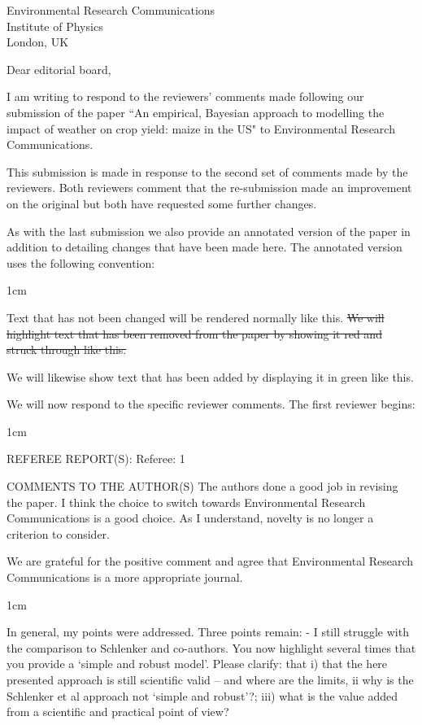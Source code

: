 \documentclass{letter}
\newcommand{\remove}[1]{   
    \color{red}
    \sout{#1}
    }
\newcommand{\add}[1]{   
    \color{green}
    #1
    }
\newcommand{\paper}[1]{   
    \begin{adjustwidth}{1cm}{}
    #1
    \end{adjustwidth}
    }
\newcommand{\review}[1]{   
    \begin{adjustwidth}{1cm}{}
    \em{#1}
    \end{adjustwidth}
    }
\begin{document}
\begin{letter}{Environmental Research Communications \\ Institute of Physics \\ London, UK}

\opening{Dear editorial board,}

I am writing to respond to the reviewers' comments made following our submission of the paper ``An empirical, Bayesian approach to modelling the impact of weather on crop yield: maize in the US" to Environmental Research Communications. 

This submission is made in response to the second set of comments made by the reviewers. Both reviewers comment that the re-submission made an improvement on the original but both have requested some further changes.




As with the last submission we also provide an annotated version of the paper in addition to detailing changes that have been made here. The annotated version uses the following convention:
\paper{
Text that has not been changed will be rendered normally like this. \remove{We will highlight text that has been removed from the paper by showing it red and struck through like this.}\add{We will likewise show text that has been added by displaying it in green like this.}
}



We will now respond to the specific reviewer comments. The first reviewer begins:


\review{
REFEREE REPORT(S):
Referee: 1

COMMENTS TO THE AUTHOR(S)
The authors done a good job in revising the paper. I think the choice to switch towards Environmental Research Communications is a good choice. As I understand, novelty is no longer a criterion to consider.
}

We are grateful for the positive comment and agree that Environmental Research Communications is a more appropriate journal.

\review{

In general, my points were addressed. Three points remain:
- I still struggle with the comparison to Schlenker and co-authors. You now highlight several times that you provide a ‘simple and robust model’. Please clarify: that i) that the here presented approach is still scientific valid – and where are the limits, ii why is the Schlenker et al approach not ‘simple and robust’?; iii) what is the value added from a scientific and practical point of view?

}
\end{letter}
\end{document}
